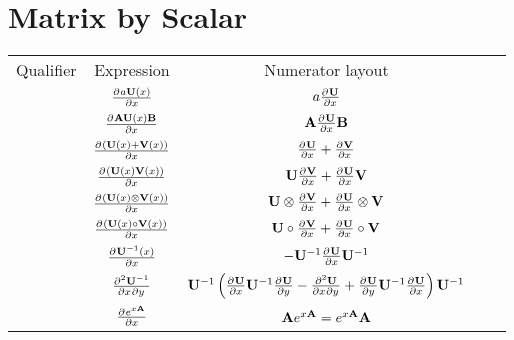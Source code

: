 \section{Matrix by Scalar}
\begin{center}
\begin{tabular}{l|Sc|Sc}
Qualifier                  & Expression                                     & Numerator layout                                       \\
                           & $\frac{\partial^{} a\mathbf{U}(x)}{\partial x}$                              & $a\frac{\partial^{} \mathbf{U}}{\partial x}$                                         \\
                           & $\frac{\partial^{} \mathbf{A}\mathbf{U}(x)\mathbf{B}}{\partial x}$                         & $\mathbf{A}\frac{\partial^{} \mathbf{U}}{\partial x}\mathbf{B}$                                    \\
                           & $\frac{\partial^{} (\mathbf{U}(x)+\mathbf{V}(x))}{\partial x}$                      & $\frac{\partial^{} \mathbf{U}}{\partial x}+\frac{\partial^{} \mathbf{V}}{\partial x}$                              \\
                           & $\frac{\partial^{} (\mathbf{U}(x)\mathbf{V}(x))}{\partial x}$                       & $\mathbf{U}\frac{\partial^{} \mathbf{V}}{\partial x}+\frac{\partial^{} \mathbf{U}}{\partial x}\mathbf{V}$                        \\
                           & $\frac{\partial^{} (\mathbf{U}(x)\otimes\mathbf{V}(x))}{\partial x}$                    & $\mathbf{U}\otimes\frac{\partial^{} \mathbf{V}}{\partial x} + \frac{\partial^{} \mathbf{U}}{\partial x}\otimes\mathbf{V}$                \\
                           & $\frac{\partial^{} (\mathbf{U}(x)\circ\mathbf{V}(x))}{\partial x}$                    & $\mathbf{U}\circ\frac{\partial^{} \mathbf{V}}{\partial x} + \frac{\partial^{} \mathbf{U}}{\partial x}\circ\mathbf{V}$                \\
                           & $\frac{\partial^{} \mathbf{U}^{-1}(x)}{\partial x}$                          & $-\mathbf{U}^{-1} \frac{\partial^{} \mathbf{U}}{\partial x} \mathbf{U}^{-1}$                       \\
                           & $\md{\mU^{-1}}{2}{x}{}{y}{}$                   & $\mU^{-1}\left(\pd{\mU}{x}\mU^{-1}\pd{\mU}{y} - \md{\mU}{2}{x}{}{y}{} + \pd{\mU}{y}\mU^{-1}\pd{\mU}{x}\right)\mU^{-1}$ \\
                           & $\frac{\partial^{} e^{x\mathbf{A}}}{\partial x}$                             & $\mathbf{A} e^{x\mathbf{A}}=e^{x\mathbf{A}}\mathbf{A}$
\end{tabular}
\end{center}